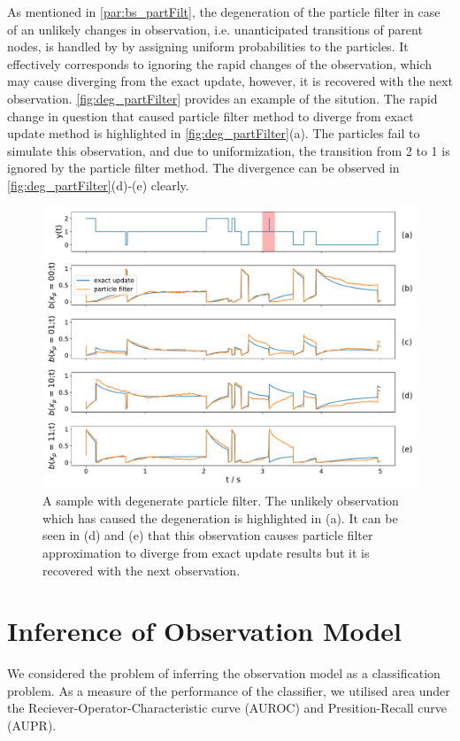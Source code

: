 As mentioned in \cref{par:bs_partFilt}, the degeneration of the particle filter in case of an unlikely changes in observation, i.e. unanticipated transitions of parent nodes, is handled by by assigning uniform probabilities to the particles. It effectively corresponds to ignoring the rapid changes of the observation, which may cause diverging from the exact update, however, it is recovered with the next observation. \autoref{fig:deg_partFilter} provides an example of the sitution. The rapid change in question that caused particle filter method to diverge from exact update method is highlighted in \autoref{fig:deg_partFilter}(a). The particles fail to simulate this observation, and due to uniformization, the transition from 2 to 1 is ignored by the particle filter method. The divergence can be observed in \autoref{fig:deg_partFilter}(d)-(e) clearly.
\begin{figure}[H]
	\begin{center}
		\includegraphics[width=.90\textwidth]{figures/degenerate_pf/belief_traj}
		\caption[Degenerate particle filter]{A sample with degenerate particle filter. The unlikely observation which has caused the degeneration is highlighted in (a). It can be seen in (d) and (e) that this observation causes particle filter approximation to diverge from exact update results but it is recovered with the next observation.}
		\label{fig:deg_partFilter}
	\end{center}
\end{figure}

\section{Inference of Observation Model}
We considered the problem of inferring the observation model as a classification problem. As a measure of the performance of the classifier, we utilised area under the Reciever-Operator-Characteristic curve (AUROC) and Presition-Recall curve (AUPR). 
